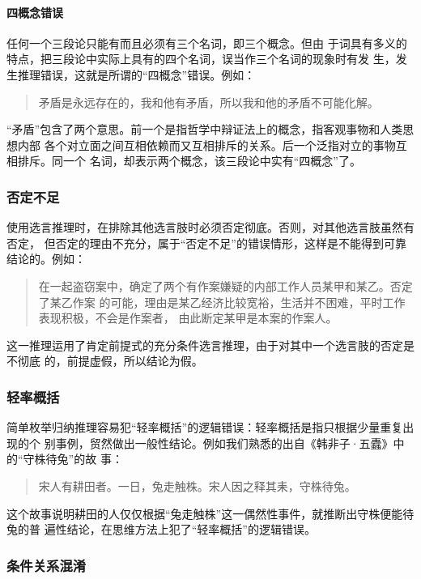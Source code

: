\documentclass[final,oneside]{ctexbook}
\newenvironment{equotation}{\begin{quotation}\kaishu}{\end{quotation}}
\begin{document}
\paragraph{四概念错误}任何一个三段论只能有而且必须有三个名词，即三个概念。但由
于词具有多义的特点，把三段论中实际上具有的四个名词，误当作三个名词的现象时有发
生，发生推理错误，这就是所谓的“四概念”错误。例如：
\begin{equotation}
  矛盾是永远存在的，我和他有矛盾，所以我和他的矛盾不可能化解。
\end{equotation}
“矛盾”包含了两个意思。前一个是指哲学中辩证法上的概念，指客观事物和人类思想内部
各个对立面之间互相依赖而又互相排斥的关系。后一个泛指对立的事物互相排斥。同一个
名词，却表示两个概念，该三段论中实有“四概念”了。

\subsubsection{否定不足}

使用选言推理时，在排除其他选言肢时必须否定彻底。否则，对其他选言肢虽然有否定，
但否定的理由不充分，属于“否定不足”的错误情形，这样是不能得到可靠结论的。例如：
\begin{equotation}
  在一起盗窃案中，确定了两个有作案嫌疑的内部工作人员某甲和某乙。否定了某乙作案
  的可能，理由是某乙经济比较宽裕，生活并不困难，平时工作表现积极，不会是作案者，
  由此断定某甲是本案的作案人。
\end{equotation}
这一推理运用了肯定前提式的充分条件选言推理，由于对其中一个选言肢的否定是不彻底
的，前提虚假，所以结论为假。

\subsubsection{轻率概括}

简单枚举归纳推理容易犯“轻率概括”的逻辑错误：轻率概括是指只根据少量重复出现的个
别事例，贸然做出一般性结论。例如我们熟悉的出自《韩非子·五蠹》中的“守株待兔”的故
事：
\begin{equotation}
  宋人有耕田者。一日，兔走触株。宋人因之释其耒，守株待兔。
\end{equotation}
这个故事说明耕田的人仅仅根据“兔走触株”这一偶然性事件，就推断出守株便能待兔的普
遍性结论，在思维方法上犯了“轻率概括”的逻辑错误。

\subsubsection{条件关系混淆}
\end{document}
